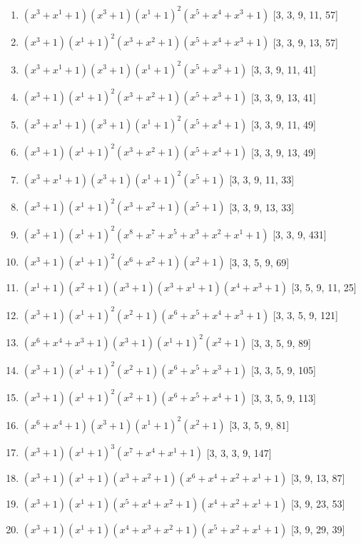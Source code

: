 \documentclass[10pt,twocolumn]{article}
\begin{document}
\begin{enumerate}
\item $(x^{3} + x^{1} + 1)(x^{3} + 1)(x^{1} + 1)^{2}(x^{5} + x^{4} + x^{3} + 1)$  [3, 3, 9, 11, 57]
\item $(x^{3} + 1)(x^{1} + 1)^{2}(x^{3} + x^{2} + 1)(x^{5} + x^{4} + x^{3} + 1)$  [3, 3, 9, 13, 57]
\item $(x^{3} + x^{1} + 1)(x^{3} + 1)(x^{1} + 1)^{2}(x^{5} + x^{3} + 1)$  [3, 3, 9, 11, 41]
\item $(x^{3} + 1)(x^{1} + 1)^{2}(x^{3} + x^{2} + 1)(x^{5} + x^{3} + 1)$  [3, 3, 9, 13, 41]
\item $(x^{3} + x^{1} + 1)(x^{3} + 1)(x^{1} + 1)^{2}(x^{5} + x^{4} + 1)$  [3, 3, 9, 11, 49]
\item $(x^{3} + 1)(x^{1} + 1)^{2}(x^{3} + x^{2} + 1)(x^{5} + x^{4} + 1)$  [3, 3, 9, 13, 49]
\item $(x^{3} + x^{1} + 1)(x^{3} + 1)(x^{1} + 1)^{2}(x^{5} + 1)$  [3, 3, 9, 11, 33]
\item $(x^{3} + 1)(x^{1} + 1)^{2}(x^{3} + x^{2} + 1)(x^{5} + 1)$  [3, 3, 9, 13, 33]
\item $(x^{3} + 1)(x^{1} + 1)^{2}(x^{8} + x^{7} + x^{5} + x^{3} + x^{2} + x^{1} + 1)$  [3, 3, 9, 431]
\item $(x^{3} + 1)(x^{1} + 1)^{2}(x^{6} + x^{2} + 1)(x^{2} + 1)$  [3, 3, 5, 9, 69]
\item $(x^{1} + 1)(x^{2} + 1)(x^{3} + 1)(x^{3} + x^{1} + 1)(x^{4} + x^{3} + 1)$  [3, 5, 9, 11, 25]
\item $(x^{3} + 1)(x^{1} + 1)^{2}(x^{2} + 1)(x^{6} + x^{5} + x^{4} + x^{3} + 1)$  [3, 3, 5, 9, 121]
\item $(x^{6} + x^{4} + x^{3} + 1)(x^{3} + 1)(x^{1} + 1)^{2}(x^{2} + 1)$  [3, 3, 5, 9, 89]
\item $(x^{3} + 1)(x^{1} + 1)^{2}(x^{2} + 1)(x^{6} + x^{5} + x^{3} + 1)$  [3, 3, 5, 9, 105]
\item $(x^{3} + 1)(x^{1} + 1)^{2}(x^{2} + 1)(x^{6} + x^{5} + x^{4} + 1)$  [3, 3, 5, 9, 113]
\item $(x^{6} + x^{4} + 1)(x^{3} + 1)(x^{1} + 1)^{2}(x^{2} + 1)$  [3, 3, 5, 9, 81]
\item $(x^{3} + 1)(x^{1} + 1)^{3}(x^{7} + x^{4} + x^{1} + 1)$  [3, 3, 3, 9, 147]
\item $(x^{3} + 1)(x^{1} + 1)(x^{3} + x^{2} + 1)(x^{6} + x^{4} + x^{2} + x^{1} + 1)$  [3, 9, 13, 87]
\item $(x^{3} + 1)(x^{1} + 1)(x^{5} + x^{4} + x^{2} + 1)(x^{4} + x^{2} + x^{1} + 1)$  [3, 9, 23, 53]
\item $(x^{3} + 1)(x^{1} + 1)(x^{4} + x^{3} + x^{2} + 1)(x^{5} + x^{2} + x^{1} + 1)$  [3, 9, 29, 39]

\end{enumerate}
\end{document}
